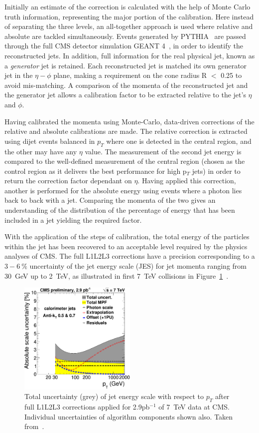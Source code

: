 Initially an estimate of the correction is calculated with the help of Monte Carlo truth information, representing the major portion of the calibration. Here instead of separating the three levels, an all-together approach is used where relative and absolute are tackled simultaneously. Events generated by \textsc{PYTHIA}~\cite{pythia} are passed through the full CMS detector simulation \textsc{GEANT 4}~\cite{GEANT4}, in order to identify the reconstructed jets. In addition, full information for the real physical jet, known as a \textit{generator} jet is retained. Each reconstructed jet is matched its own generator jet in the $\eta - \phi$ plane, making a requirement on the cone radius R $<$ 0.25 to avoid mis-matching. A comparison of the momenta of the reconstructed jet and the generator jet allows a calibration factor to be extracted relative to the jet's $\eta$ and $\phi$. 

Having calibrated the momenta using Monte-Carlo, data-driven corrections of the relative and absolute calibrations are made. The relative correction is extracted using dijet events balanced in $p_{T}$ where one is detected in the central region, and the other may have any $\eta$ value. The measurement of the second jet energy is compared to the well-defined measurement of the central region (chosen as the control region as it delivers the best performance for high p$_{T}$ jets) in order to return the correction factor dependant on $\eta$.  Having applied this correction, another is performed for the absolute energy using events where a photon lies back to back with a jet. Comparing the momenta of the two gives an understanding of the distribution of the percentage of energy that has been included in a jet yielding the required factor.

With the application of the steps of calibration, the total energy of the particles within the jet has been recovered to an acceptable level required by the physics analyses of CMS. The full L1L2L3 corrections have a precision corresponding to a $3 - 6~\%$ uncertainty of the jet energy scale (JES) for jet momenta ranging from 30~GeV up to 2~TeV, as illustrated in first 7~TeV collisions in Figure~\ref{fig:JESU}~\cite{JME-10-010}.


\begin{figure}
\centering
\includegraphics[width=0.5\textwidth]{Figures/Objects/JESU}
\caption{\label{fig:JESU}Total uncertainty (grey) of jet energy scale with respect to $p_{T}$ after full L1L2L3 corrections applied for 2.9pb$^{-1}$ of 7~TeV data at CMS. Individual uncertainties of algorithm components shown also. Taken from~\cite{JME-10-010}.}
\end{figure}

